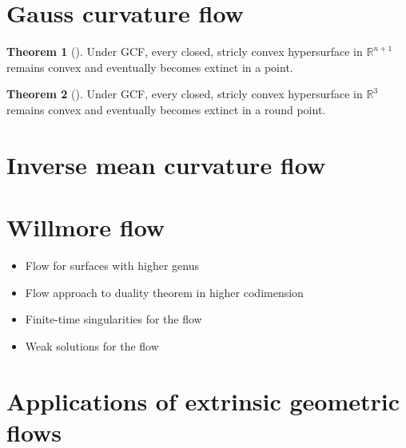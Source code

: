 \documentclass{amsart}
\theoremstyle{definition}
\newtheorem{Thm}{Theorem}[section]
\begin{document}
\newpage

\section{Gauss curvature flow}

\begin{refsection}

\begin{Thm}[\cite{Tso1985}]
Under GCF, every closed, stricly convex hypersurface in $\mathbb{R}^{n+1}$ remains convex and eventually becomes extinct in a point.
\end{Thm}

\begin{Thm}[\cite{Andrews2000}]
Under GCF, every closed, stricly convex hypersurface in $\mathbb{R}^{3}$ remains convex and eventually becomes extinct in a round point.
\end{Thm}

\printbibliography[heading=subbibliography]
\end{refsection}

\section{Inverse mean curvature flow}

\begin{refsection}

\printbibliography[heading=subbibliography]
\end{refsection}

\section{Willmore flow}

\begin{refsection}

\begin{itemize}
\item Flow for surfaces with higher genus
\item Flow approach to duality theorem in higher codimension
\item Finite-time singularities for the flow
\item Weak solutions for the flow
\end{itemize}

\printbibliography[heading=subbibliography]
\end{refsection}

\section{Applications of extrinsic geometric flows}
\end{document}
